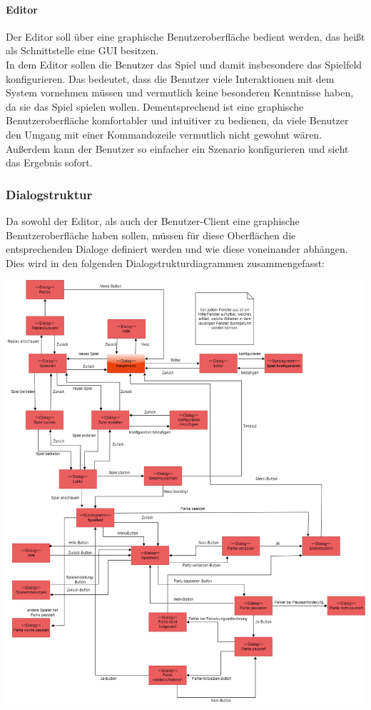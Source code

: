 \documentclass[12pt]{article}
\newcounter{fa}
\newcounter{nfa}
\begin{document}
\paragraph{Editor}
Der Editor soll über eine graphische Benutzeroberfläche bedient werden, das heißt als Schnittstelle 
eine GUI besitzen. \\ In dem Editor sollen die Benutzer das Spiel und damit insbesondere das Spielfeld konfigurieren. Das bedeutet, dass die Benutzer viele Interaktionen mit dem System vornehmen müssen und vermutlich keine besonderen Kenntnisse haben, da sie das Spiel spielen wollen. Dementsprechend ist eine graphische Benutzeroberfläche komfortabler und intuitiver zu bedienen, da viele Benutzer den Umgang mit einer Kommandozeile vermutlich nicht gewohnt wären. Außerdem kann der Benutzer so einfacher ein Szenario konfigurieren und sieht das Ergebnis sofort. 
\subsubsection{Dialogstruktur}
Da sowohl der Editor, als auch der Benutzer-Client eine graphische Benutzeroberfläche haben sollen, müssen für diese Oberflächen die entsprechenden Dialoge definiert werden und wie diese voneinander abhängen. Dies wird in den folgenden Dialogstrukturdiagrammen zusammengefasst: 

\includegraphics[width=\textwidth]{images/meilen3_a1_Hauptdiagramm}
\end{document}
